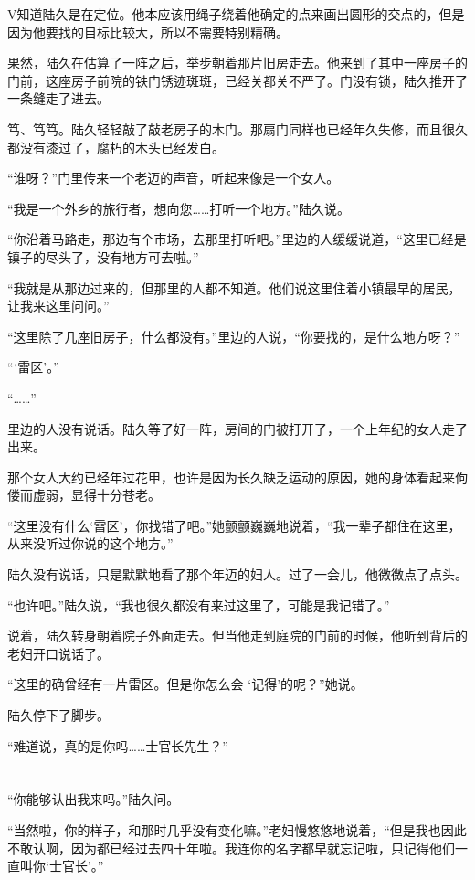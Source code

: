 V知道陆久是在定位。他本应该用绳子绕着他确定的点来画出圆形的交点的，但是因为他要找的目标比较大，所以不需要特别精确。

果然，陆久在估算了一阵之后，举步朝着那片旧房走去。他来到了其中一座房子的门前，这座房子前院的铁门锈迹斑斑，已经关都关不严了。门没有锁，陆久推开了一条缝走了进去。

笃、笃笃。陆久轻轻敲了敲老房子的木门。那扇门同样也已经年久失修，而且很久都没有漆过了，腐朽的木头已经发白。

“谁呀？”门里传来一个老迈的声音，听起来像是一个女人。

“我是一个外乡的旅行者，想向您……打听一个地方。”陆久说。

“你沿着马路走，那边有个市场，去那里打听吧。”里边的人缓缓说道，“这里已经是镇子的尽头了，没有地方可去啦。”

“我就是从那边过来的，但那里的人都不知道。他们说这里住着小镇最早的居民，让我来这里问问。”

“这里除了几座旧房子，什么都没有。”里边的人说，“你要找的，是什么地方呀？”

“‘雷区’。”

“……”

里边的人没有说话。陆久等了好一阵，房间的门被打开了，一个上年纪的女人走了出来。

那个女人大约已经年过花甲，也许是因为长久缺乏运动的原因，她的身体看起来佝偻而虚弱，显得十分苍老。

“这里没有什么‘雷区’，你找错了吧。”她颤颤巍巍地说着，“我一辈子都住在这里，从来没听过你说的这个地方。”

陆久没有说话，只是默默地看了那个年迈的妇人。过了一会儿，他微微点了点头。

“也许吧。”陆久说，“我也很久都没有来过这里了，可能是我记错了。”

说着，陆久转身朝着院子外面走去。但当他走到庭院的门前的时候，他听到背后的老妇开口说话了。

“这里的确曾经有一片雷区。但是你怎么会 ‘记得’的呢？”她说。

陆久停下了脚步。

“难道说，真的是你吗……士官长先生？”

\section*{}

“你能够认出我来吗。”陆久问。

“当然啦，你的样子，和那时几乎没有变化嘛。”老妇慢悠悠地说着，“但是我也因此不敢认啊，因为都已经过去四十年啦。我连你的名字都早就忘记啦，只记得他们一直叫你‘士官长’。”

